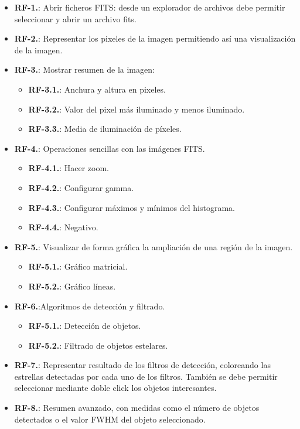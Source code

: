 \begin{itemize}
	\item \textbf{RF-1.}: Abrir ficheros FITS: desde un explorador de archivos debe permitir seleccionar y abrir un archivo fits.
	\item \textbf{RF-2.}: Representar los pixeles de la imagen permitiendo así una visualización de la imagen.
	
	\item \textbf{RF-3.}: Mostrar resumen de la imagen:
	\begin{itemize}
		\item \textbf{RF-3.1.}: Anchura y altura en pixeles.
		\item \textbf{RF-3.2.}: Valor del pixel más iluminado y menos iluminado.
		\item \textbf{RF-3.3.}: Media de iluminación de píxeles.
	\end{itemize} 
	
	\item \textbf{RF-4.}: Operaciones sencillas con las imágenes FITS.
	\begin{itemize}
		\item \textbf{RF-4.1.}: Hacer zoom.
		\item \textbf{RF-4.2.}: Configurar gamma.
		\item \textbf{RF-4.3.}: Configurar máximos y mínimos del histograma.
		\item \textbf{RF-4.4.}: Negativo.
	\end{itemize}
	\item \textbf{RF-5.}: Visualizar de forma gráfica la ampliación de una región de la imagen.
	\begin{itemize}
		\item \textbf{RF-5.1.}: Gráfico matricial.
		\item \textbf{RF-5.2.}: Gráfico líneas.
	\end{itemize}
	
	\item \textbf{RF-6.}:Algoritmos de detección y filtrado.
	\begin{itemize}
		\item \textbf{RF-5.1.}:  Detección de objetos.
		\item \textbf{RF-5.2.}:  Filtrado de objetos estelares.
	\end{itemize}
	
	\item \textbf{RF-7.}: Representar  resultado de los filtros de detección, coloreando las estrellas detectadas por cada uno de los filtros. 	También se debe permitir seleccionar mediante doble click los objetos interesantes.
	
	\item \textbf{RF-8.}: Resumen avanzado, con medidas como el número de objetos detectados o el valor FWHM del objeto seleccionado.
	 
\end{itemize}


